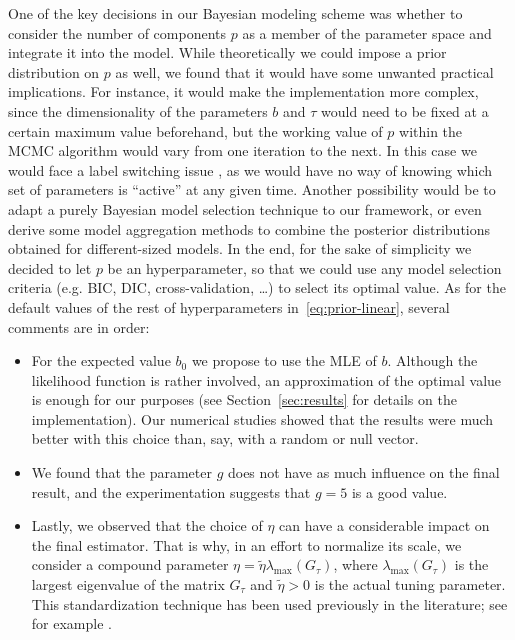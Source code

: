 \documentclass[ba]{imsart}
\numberwithin{equation}{section}
\theoremstyle{plain}
\begin{document}
One of the key decisions in our Bayesian modeling scheme was whether to consider the number of components \(p\) as a member of the parameter space and integrate it into the model. While theoretically we could impose a prior distribution on \(p\) as well, we found that it would have some unwanted practical implications. For instance, it would make the implementation more complex, since the dimensionality of the parameters \(b\) and \(\tau\) would need to be fixed at a certain maximum value beforehand, but the working value of \(p\) within the MCMC algorithm would vary from one iteration to the next. In this case we would face a label switching issue \citep[c.f.][Sec.~2.3]{grollemund2019bayesian}, as we would have no way of knowing which set of parameters is ``active'' at any given time. Another possibility would be to adapt a purely Bayesian model selection technique \citep[e.g.][Ch.~7]{piironen2017comparison, gelman1995bayesian} to our framework, or even derive some model aggregation methods to combine the posterior distributions obtained for different-sized models. In the end, for the sake of simplicity we decided to let \(p\) be an hyperparameter, so that we could use any model selection criteria (e.g. BIC, DIC, cross-validation, \ldots) to select its optimal value. As for the default values of the rest of hyperparameters in~\eqref{eq:prior-linear}, several comments are in order:
\begin{itemize}
  \item For the expected value \(b_0\) we propose to use the MLE of \(b\). Although the likelihood function is rather involved, an approximation of the optimal value is enough for our purposes (see Section~\ref{sec:results} for details on the implementation). Our numerical studies showed that the results were much better with this choice than, say, with a random or null vector.
  \item We found that the parameter \(g\) does not have as much influence on the final result, and the experimentation suggests that \(g=5\) is a good value.
  \item Lastly, we observed that the choice of \(\eta\) can have a considerable impact on the final estimator. That is why, in an effort to normalize its scale, we consider a compound parameter \(\eta = \tilde \eta \lambda_{\max}(G_\tau)\), where \(\lambda_{\max}(G_\tau)\) is the largest eigenvalue of the matrix \(G_\tau\) and \(\tilde\eta > 0\) is the actual tuning parameter. This standardization technique has been used previously in the literature; see for example \citet{grollemund2019bayesian}.
\end{itemize}
\end{document}
